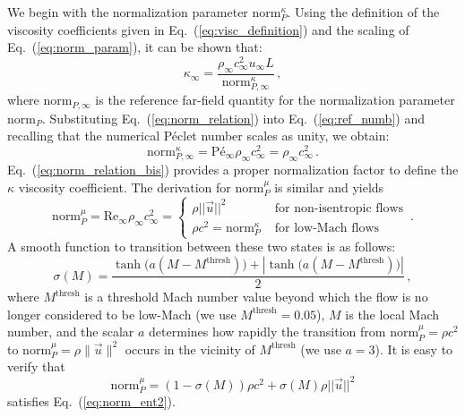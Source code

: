 \documentclass[preprint,10pt]{elsarticle}
\newcommand{\norm}{\textrm{norm}}
\renewcommand{\Re}{\textrm{Re}}
\newcommand{\Pe}{\textrm{P\'e}}
\newcommand{\eqt}[1]{Eq.~(\ref{#1})}                     %
\begin{document}
We begin with the  normalization parameter $\norm_P^\kappa$. Using the 
definition of the viscosity coefficients given in \eqt{eq:visc_definition} and the scaling of 
\eqt{eq:norm_param}, it can be shown that:
%
\begin{equation}
\label{eq:norm_relation}
\kappa_\infty = \frac{ \rho_\infty c_\infty^2 u_\infty L }{ \norm_{P,\infty}^{\kappa} } \, ,
\end{equation}
%
where $\norm_{P,\infty}$ is the reference far-field quantity for the normalization parameter $\norm_P$. 
Substituting \eqt{eq:norm_relation} into \eqt{eq:ref_numb} and recalling that the numerical P\'eclet 
number scales as unity, we obtain:
%
\begin{equation}
\label{eq:norm_relation_bis}
\norm_{P,\infty}^{\kappa} = \Pe_\infty \rho_\infty c_\infty^2 = \rho_\infty c_\infty^2 \, .
\end{equation}
%
\eqt{eq:norm_relation_bis} provides a proper normalization factor to define the $\kappa$ viscosity coefficient.
%
The derivation for $\norm_P^\mu$ is similar and yields
\begin{equation}
\label{eq:norm_ent2}
\norm_P^\mu = \Re_\infty \rho_\infty c_\infty^2 =  \left\{
\begin{array}{ll}
 \rho ||\vec{u} ||^2       & \text{ for non-isentropic flows} \\
 \rho c^2 = \norm_P^\kappa & \text{ for low-Mach flows}
\end{array}
\right. \,.
\end{equation}
A smooth function to transition between these two states is as follows: %
\begin{equation}
 \sigma(M) = \frac{\tanh\big(a(M-M^\text{thresh})\big) + | \tanh\big(a(M-M^\text{thresh})\big) | }{2} \,,
\end{equation}
where $M^\text{thresh}$ is a threshold Mach number value beyond which the flow is no longer 
considered  to be low-Mach (we use $M^\text{thresh}=0.05$), $M$ is the local Mach number, 
and the scalar $a$ determines how rapidly the transition from  
$\norm_P^\mu= \rho c^2$ to $\norm_P^\mu=\rho \| \vec{u}\|^2$ occurs in the vicinity of $M^\text{thresh}$ (we use $a = 3$). 
It is easy to verify that
\begin{equation}
\label{eq:norm_ent3}
\norm_P^\mu = (1-\sigma(M)) \rho c^2  + \sigma(M)  \rho ||\vec{u} ||^2  
\end{equation}
satisfies \eqt{eq:norm_ent2}.
\end{document}

